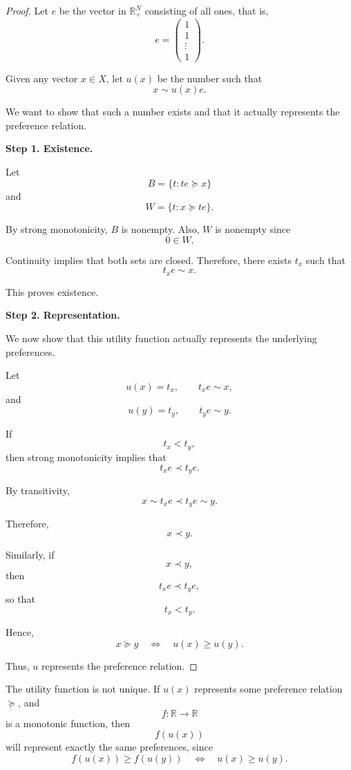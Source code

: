 \begin{proof}
Let \(e\) be the vector in \(\mathbb{R}_+^N\) consisting of all ones, that is,
\[
e =
\begin{pmatrix}
1\\
1\\
\vdots\\
1
\end{pmatrix}.
\]

Given any vector \(x \in X\), let \(u(x)\) be the number such that
\[
x \sim u(x)e.
\]

We want to show that such a number exists and that it actually represents the preference relation.

\medskip

\noindent
\textbf{Step 1. Existence.}

Let
\[
B = \{t : te \succeq x\}
\]
and
\[
W = \{t : x \succeq te\}.
\]

By strong monotonicity, \(B\) is nonempty.  
Also, \(W\) is nonempty since
\[
0 \in W.
\]

Continuity implies that both sets are closed. Therefore, there exists \(t_x\) such that
\[
t_x e \sim x.
\]

This proves existence.

\medskip

\noindent
\textbf{Step 2. Representation.}

We now show that this utility function actually represents the underlying preferences.

Let
\[
u(x)=t_x,
\qquad
t_x e \sim x,
\]
and
\[
u(y)=t_y,
\qquad
t_y e \sim y.
\]

If
\[
t_x < t_y,
\]
then strong monotonicity implies that
\[
t_x e \prec t_y e.
\]

By transitivity,
\[
x \sim t_x e \prec t_y e \sim y.
\]

Therefore,
\[
x \prec y.
\]

Similarly, if
\[
x \prec y,
\]
then
\[
t_x e \prec t_y e,
\]
so that
\[
t_x < t_y.
\]

Hence,
\[
x \succeq y
\quad \Longleftrightarrow \quad
u(x) \ge u(y).
\]

Thus, \(u\) represents the preference relation.
\end{proof}

The utility function is not unique. If \(u(x)\) represents some preference relation \(\succeq\), and
\[
f : \mathbb{R} \to \mathbb{R}
\]
is a monotonic function, then
\[
f(u(x))
\]
will represent exactly the same preferences, since
\[
f(u(x)) \ge f(u(y))
\quad \Longleftrightarrow \quad
u(x) \ge u(y).
\]

